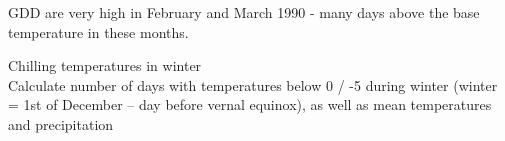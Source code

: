 \documentclass[10pt,]{article}
\newenvironment{Shaded}{\begin{snugshade}}{\end{snugshade}}
\newcommand{\KeywordTok}[1]{\textcolor[rgb]{0.13,0.29,0.53}{\textbf{#1}}}
\newcommand{\DecValTok}[1]{\textcolor[rgb]{0.00,0.00,0.81}{#1}}
\newcommand{\StringTok}[1]{\textcolor[rgb]{0.31,0.60,0.02}{#1}}
\newcommand{\CommentTok}[1]{\textcolor[rgb]{0.56,0.35,0.01}{\textit{#1}}}
\newcommand{\OperatorTok}[1]{\textcolor[rgb]{0.81,0.36,0.00}{\textbf{#1}}}
\newcommand{\NormalTok}[1]{#1}
\begin{document}
GDD are very high in February and March 1990 - many days above the base
temperature in these months.

\newpage

Chilling temperatures in winter\\
Calculate number of days with temperatures below 0 / -5 during winter
(winter = 1st of December -- day before vernal equinox), as well as mean
temperatures and precipitation

\begin{Shaded}
\end{Shaded}
\end{document}
